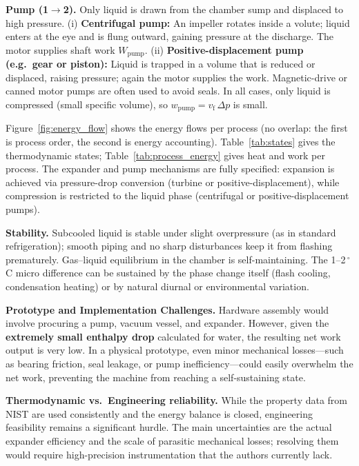 \documentclass[11pt,a4paper]{article}
\begin{document}
\textbf{Pump (1$\to$2).} Only liquid is drawn from the chamber sump and
displaced to high pressure. (i) \textbf{Centrifugal pump:} An impeller rotates
inside a volute; liquid enters at the eye and is flung outward, gaining
pressure at the discharge. The motor supplies shaft work $W_{\mathrm{pump}}$.
(ii) \textbf{Positive-displacement pump (e.g.\ gear or piston):} Liquid is
trapped in a volume that is reduced or displaced, raising pressure; again the
motor supplies the work. Magnetic-drive or canned motor pumps are often used
to avoid seals. In all cases, only liquid is compressed (small specific volume),
so $w_{\mathrm{pump}} = v_{\mathrm{f}}\,\Delta p$ is small.

Figure~\ref{fig:energy_flow} shows
the energy flows per process (no overlap: the first is process order, the second is
energy accounting). Table~\ref{tab:states} gives the thermodynamic states;
Table~\ref{tab:process_energy} gives heat and work per process. The expander and pump mechanisms are fully specified: expansion is 
achieved via pressure-drop conversion (turbine or positive-displacement), 
while compression is restricted to the liquid phase (centrifugal or 
positive-displacement pumps).

\textbf{Stability.} Subcooled liquid is stable under slight overpressure (as in standard refrigeration);
smooth piping and no sharp disturbances keep it from flashing prematurely.
Gas--liquid equilibrium in the chamber is self-maintaining. The 1--2\,$^\circ$C
micro difference can be sustained by the phase change itself (flash cooling,
condensation heating) or by natural diurnal or environmental variation.

\textbf{Prototype and Implementation Challenges.} Hardware assembly would involve 
procuring a pump, vacuum vessel, and expander. However, given the 
\textbf{extremely small enthalpy drop} calculated for water, the resulting net 
work output is very low. In a physical prototype, even minor mechanical 
losses—such as bearing friction, seal leakage, or pump inefficiency—could 
easily overwhelm the net work, preventing the machine from reaching a self-sustaining 
state.

\textbf{Thermodynamic vs.\ Engineering reliability.} While the property data 
from NIST are used consistently and the energy balance is closed, engineering 
feasibility remains a significant hurdle. The main uncertainties are the actual 
expander efficiency and the scale of parasitic mechanical losses; resolving 
them would require high-precision instrumentation that the authors currently 
lack.
\end{document}
